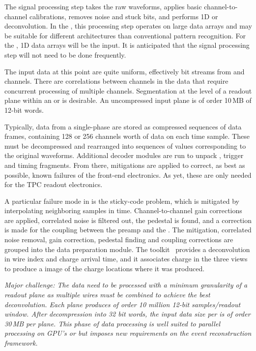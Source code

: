 \documentclass[../main-v1.tex]{subfiles}
\begin{document}
The signal processing step takes the raw waveforms, applies  basic channel-to-channel calibrations, removes noise and stuck bits, and performs 1D or \twod deconvolution.   In the , this processing step operates on large \twod data arrays and may be suitable for different architectures than conventional pattern recognition. For the , 1D data arrays will be the input. It is anticipated that the signal processing step will not need to be done frequently. 

The input data at this point are quite uniform, effectively bit streams from  and  channels.  There are correlations between channels in the  data that require concurrent processing of multiple channels.  Segmentation at the level of a readout plane within an   or  is desirable.  An uncompressed input  plane is of order 10\,MB of 12-bit words. 



Typically, data from a single-phase   are stored as compressed sequences of data frames, containing 128 or 256 channels worth of data on each time sample.  These must be decompressed and rearranged into sequences of  values corresponding to the original waveforms.  Additional decoder modules are run to unpack ,  trigger and timing  fragments.
From there, mitigations are applied to correct, as best as possible, known failures of the front-end electronics.  As yet, these are only needed for the TPC readout electronics.  

A particular failure mode in  is the sticky-code problem, which is mitigated by interpolating neighboring  samples in time.  Channel-to-channel gain corrections are applied, correlated noise is filtered out, the pedestal is found, and a correction is made for the  coupling between the preamp and the .  The  mitigation, correlated noise removal, gain correction, pedestal finding and  coupling corrections are grouped into the data preparation module.  The  toolkit~\cite{wirecell,ref:wire_cell_toolkit,ref:pdune_signal_processing} provides a \twod deconvolution in wire index and charge arrival time, and it associates charge in the three views to produce a \threed image of the charge locations where it was produced.  

{\it Major challenge: The  data need to be processed with a minimum granularity of a readout plane as multiple wires must be combined to achieve the best \twod deconvolution.  Each plane produces of order 10 million 12-bit samples/readout window. After decompression into 32 bit words, the input data size %
per  is of order 30\,MB per plane. This phase of data processing is well suited to parallel processing on GPU's or  but imposes new requirements on the event reconstruction framework. }
\end{document}
